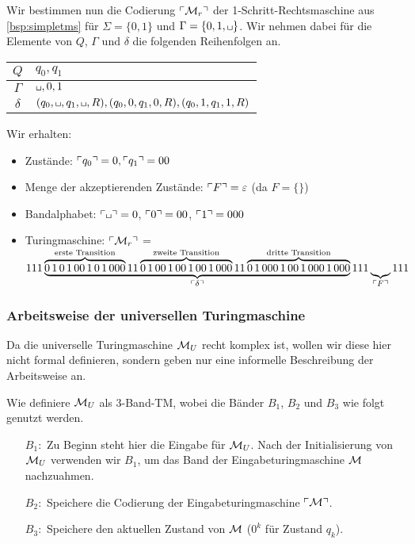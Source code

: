 \begin{Bsp}\label{bsp:CodeVonMr}
	Wir bestimmen nun die Codierung $\ulcorner \mathcal{M}_r \urcorner$ der 1-Schritt-Rechtsmaschine aus \autoref{bsp:simpletms} für $\Sigma = \{0, 1\}$ und $\Gamma = \{0, 1, \blank\}$.
	Wir nehmen dabei für die Elemente von $Q$, $\Gamma$ und $\delta$ die folgenden Reihenfolgen an.
	
	\begin{center}
	\begin{tabular}{c|l}
    $Q$ & $q_0,q_1$\\ \hline
    $\Gamma$ & $\blank, 0, 1$\\ \hline
    $\delta$ & $(q_0, \blank, q_1, \blank, R), (q_0, 0, q_1, 0, R), (q_0, 1, q_1, 1, R)$
	\end{tabular}
	\end{center}
	Wir erhalten:
	\begin{itemize}
		\item Zustände: $\ulcorner q_0 \urcorner = 0, \ulcorner q_1 \urcorner = 00$
		
		\item Menge der akzeptierenden Zustände: $\ulcorner F \urcorner = \varepsilon$ (da $F = \{\}$)
		
		\item Bandalphabet: $\godel{\blank} = 0$, $\ulcorner 0 \urcorner = 00$, $\ulcorner 1 \urcorner = 000$
	
		\item Turingmaschine: $\ulcorner \mathcal{M}_r \urcorner$ = \\ $111 \underbrace{\overbrace{0\,1\,0\,1\,00\,1\,0\,1\,000}^\text{erste Transition} 11 \overbrace{0\,1\,00\,1\,00\,1\,00\,1\,000}^\text{zweite Transition} 11 \overbrace{0\,1\,000\,1\,00\,1\,000\,1\,000}^\text{dritte Transition}}_{\ulcorner \delta \urcorner}111\underbrace{\,}_{\ulcorner F \urcorner}111$
		\qedhere
	\end{itemize}
\end{Bsp}



\subsubsection{Arbeitsweise der universellen Turingmaschine}
Da die universelle Turingmaschine $\mathcal{M}_U$ recht komplex ist, wollen wir diese hier nicht formal definieren, sondern geben nur eine informelle Beschreibung der Arbeitsweise an.


Wie definiere $\mathcal{M}_U$ als 3-Band-\ac{TM}, wobei die Bänder $B_1$, $B_2$ und $B_3$ wie folgt genutzt werden.
\begin{itemize}
\item[$B_1:$] Zu Beginn steht hier die Eingabe für $\mathcal{M}_U$.
Nach der Initialisierung von $\mathcal{M}_U$ verwenden wir $B_1$, um das Band der Eingabeturingmaschine $\mathcal{M}$ nachzuahmen.
\item[$B_2:$] Speichere die Codierung der Eingabeturingmaschine $\ulcorner \mathcal{M} \urcorner$.
\item[$B_3:$] Speichere den aktuellen Zustand von $\mathcal{M}$ ($0^k$ für Zustand $q_k$).
\end{itemize}

